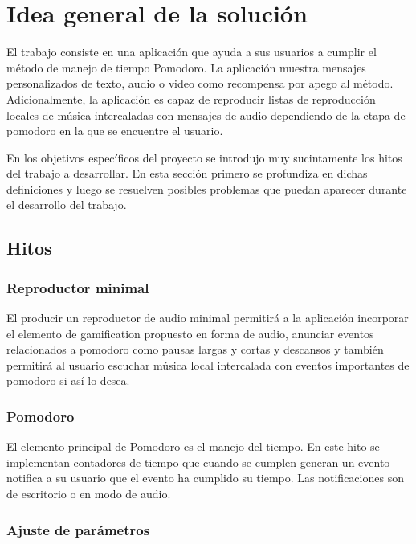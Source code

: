 \documentclass[12pt,letterpaper]{report}
\begin{document}
\newpage
\section{Idea general de la solución}\label{idea-general-de-la-solucion}

El trabajo consiste en una aplicación que ayuda a sus usuarios a
cumplir el método de manejo de tiempo Pomodoro. La aplicación muestra
mensajes personalizados de texto, audio o video como recompensa por
apego al método. Adicionalmente, la aplicación es capaz de reproducir
listas de reproducción locales de música intercaladas con mensajes de
audio dependiendo de la etapa de pomodoro en la que se encuentre el
usuario.

En los objetivos específicos del proyecto se introdujo muy
sucintamente los hitos del trabajo a desarrollar. En esta sección
primero se profundiza en dichas definiciones y luego se resuelven
posibles problemas que puedan aparecer durante el desarrollo del
trabajo.

\subsection{Hitos}

\subsubsection{Reproductor minimal}

El producir un reproductor de audio minimal permitirá a la aplicación
incorporar el elemento de gamification propuesto en forma de audio,
anunciar eventos relacionados a pomodoro como pausas largas y cortas y
descansos y también permitirá al usuario escuchar música local
intercalada con eventos importantes de pomodoro si así lo desea.

\subsubsection{Pomodoro}

El elemento principal de Pomodoro es el manejo del tiempo. En este
hito se implementan contadores de tiempo que cuando se cumplen generan
un evento notifica a su usuario que el evento ha cumplido su
tiempo. Las notificaciones son de escritorio o en modo de audio.

\subsubsection{Ajuste de parámetros}
\end{document}
